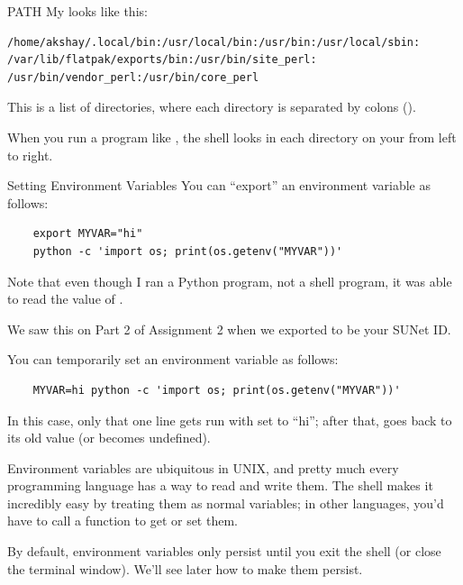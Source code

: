 \begin{frame}[fragile]{PATH}
  My  looks like this:
  \begin{verbatim}
/home/akshay/.local/bin:/usr/local/bin:/usr/bin:/usr/local/sbin:
/var/lib/flatpak/exports/bin:/usr/bin/site_perl:
/usr/bin/vendor_perl:/usr/bin/core_perl
  \end{verbatim}

  This is a list of directories, where each directory is separated by colons
  (\cmd{:}).

  When you run a program like , the shell looks in each directory on
  your  from left to right.
\end{frame}

\begin{frame}[fragile]{Setting Environment Variables}
  You can \enquote{export} an environment variable as follows:
  \begin{verbatim}
    export MYVAR="hi"
    python -c 'import os; print(os.getenv("MYVAR"))'
  \end{verbatim}

   {
    Note that even though I ran a Python program, not a shell program, it was
    able to read the value of .
  }

   {
    We saw this on Part 2 of Assignment 2 when we exported  to be
    your SUNet ID.
  }

  \pause

  You can temporarily set an environment variable as follows:
  \begin{verbatim}
    MYVAR=hi python -c 'import os; print(os.getenv("MYVAR"))'
  \end{verbatim}

   {
    In this case, only that one line gets run with  set to
    \enquote{hi}; after that,  goes back to its old value (or
    becomes undefined).
  }
\end{frame}

Environment variables are ubiquitous in UNIX, and pretty much every programming
language has a way to read and write them.  The shell makes it incredibly easy by
treating them as normal variables; in other languages, you'd have to call a
function to get or set them.

By default, environment variables only persist until you exit the shell (or
close the terminal window).  We'll see later how to make them persist.

